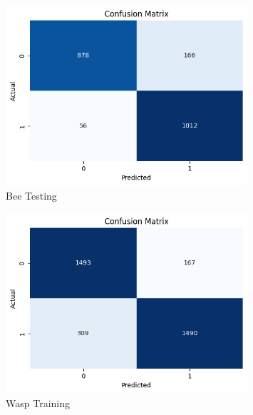 \documentclass[12pt]{article}
\begin{document}
\begin{enumerate}
\begin{figure}[H]
			\hfill
			\begin{minipage}{0.45\textwidth}    
				\centering
				\includegraphics[width=0.8\textwidth]{Images/Confusion/res bees test.png} \\ \vspace{0.25 cm}
				Bee Testing
			\end{minipage}
			\newline
			\begin{minipage}{0.45\textwidth}
				\vspace{ 1.5 cm}
				\centering
				\includegraphics[width=0.8\textwidth]{Images/Confusion/res wasps train.png} \\ \vspace{0.25 cm}
				Wasp Training
			\end{minipage}
			\hfill
			\begin{minipage}{0.45\textwidth}
				\centering

\end{minipage}
\end{figure}
\end{enumerate}
\end{document}
